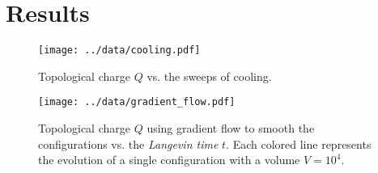 \documentclass[12pt,a4paper]{article}
\begin{document}
\section{Results}
\begin{figure}
\texttt{[image: ../data/cooling.pdf]}
\caption{Topological charge $Q$ vs. the sweeps of cooling.}
\end{figure}

\begin{figure}
\texttt{[image: ../data/gradient\_flow.pdf]}
\caption{Topological charge $Q$ using gradient flow to smooth the configurations vs. the \emph{Langevin time} $t$. Each colored line represents the evolution of a single configuration with a volume $V = 10^{4}$.}
\end{figure}
\end{document}
